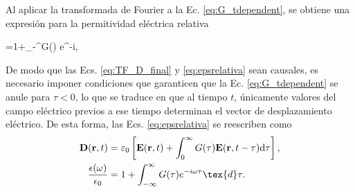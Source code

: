 Al aplicar la transformada de Fourier a la Ec. \eqref{eq:G_tdependent}, se obtiene una expresión para la permitividad eléctrica relativa
%
\begin{tcolorbox}
	=1+\int_{-\infty}^{\infty}G(\tau) e^{-i\omega\tau}\tau,
	\label{eq:epsrelativa} 
\end{tcolorbox}
%
De modo que las Ecs. \eqref{eq:TF_D_final} y \eqref{eq:epsrelativa} sean causales, es necesario imponer condiciones que garanticen que la Ec. \eqref{eq:G_tdependent} se anule para $\tau<0$, lo que se traduce en que al tiempo $t$, únicamente valores del campo eléctrico previos a ese tiempo determinan el vector de desplazamiento eléctrico. De esta forma, las Ecs. \eqref{eq:epsrelativa} se reescriben como
%
\begin{align*}
	\vb{D}(\vb{r},t)&=\varepsilon_0\left[\vb{E}(\vb{r},t)+\int_{0}^{\infty}G(\tau)\vb{E}(\vb{r},t-\tau)\text{d}\tau\right],\\ \label{eq:TF_D_final}
	\frac{\epsilon(\omega)}{\epsilon_0}&=1+\int_{-\infty}^{\infty}G(\tau) e^{-i\omega\tau}\tex{d}\tau.
\end{align*}



















